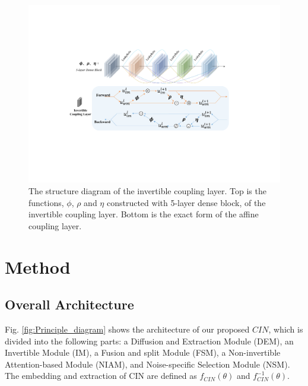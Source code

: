 \documentclass[sigconf]{acmart}
\begin{document}
\begin{figure}[]
	\centering
	\includegraphics[width=1\linewidth]{picture/coupling_layer.pdf}
	\caption{The structure diagram of the invertible coupling layer. Top is the functions, $\phi$, $\rho$ and $\eta$ constructed with 5-layer dense block, of the invertible coupling layer. Bottom is the exact form of the affine coupling layer.}
	\label{fig:Inv module}
\end{figure}






\section{Method}
\subsection{Overall Architecture}


Fig. \ref{fig:Principle_diagram} shows the architecture of our proposed $CIN$, which is divided into the following parts: a Diffusion and Extraction Module (DEM), an Invertible Module (IM), a Fusion and split Module (FSM), a Non-invertible Attention-based Module (NIAM), and Noise-specific Selection Module (NSM). The embedding and extraction of $\text{CIN}$ are defined as $f_{CIN}(\theta)$ and $f_{CIN}^{-1}(\theta)$. 
\end{document}

